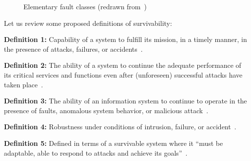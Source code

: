 \documentclass[onecolumn,conference]{IEEEtran}
\begin{document}
    \begin{figure}[htbp]
        \centering
        \caption{Elementary fault classes (redrawn from~\cite{b1})}
        \label{fig:1}
    \end{figure}

    Let us review some proposed definitions of survivability:

    \textbf{Definition 1:} Capability of a system to fulfill its mission, in a timely manner, in the presence of attacks, failures, or accidents~\cite{b3, b4, b5, b6}.

    \textbf{Definition 2:} The ability of a system to continue the adequate performance of its critical services and functions even after (unforeseen) successful attacks have taken place~\cite{b16}.

    \textbf{Definition 3:} The ability of an information system to continue to operate in the presence of faults, anomalous system behavior, or malicious attack~\cite{b14}.

    \textbf{Definition 4:} Robustness under conditions of intrusion, failure, or accident~\cite{b11}.

    \textbf{Definition 5:} Defined in terms of a survivable system where it ``must be adaptable, able to respond to attacks and achieve its goals''~\cite{b13}.
\end{document}
